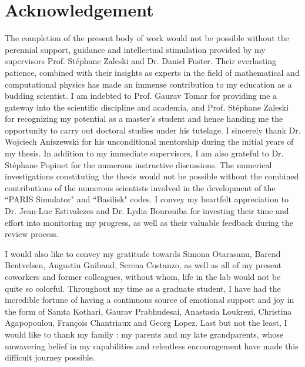 \chapter*{Acknowledgement}

The completion of the present body of work would not be possible without the perennial support, guidance and intellectual stimulation provided by my supervisors Prof. St\'ephane Zaleski and Dr. Daniel Fuster. Their everlasting patience, combined with their insights as experts in the field of mathematical and computational physics has made an immense contribution to my education as a budding scientist. I am indebted to Prof. Gaurav Tomar for providing me a gateway into the scientific discipline and academia, and Prof. St\'ephane Zaleski for recognizing my potential as a master's student and hence handing me the opportunity to carry out doctoral studies under his tutelage. I sincerely thank Dr. Wojciech Aniszewski for his unconditional mentorship during the initial years of my thesis. In addition to my immediate supervisors, I am also grateful to Dr. St\'ephane Popinet for the numerous instructive discussions. The numerical investigations constituting the thesis would not be possible without the combined contributions of the numerous scientists involved in the development of the ``PARIS Simulator" and ``Basilisk" codes. I convey my heartfelt appreciation to Dr. Jean-Luc Estivalezes and Dr. Lydia Bourouiba for investing their time and effort into monitoring my progress, as well as their valuable feedback during the review process.  

I would also like to convey my gratitude towards Simona Otarasanu, Barend Bentvelsen, Augustin Guibaud, Serena Costanzo, as well as all of my present coworkers and former colleagues, without whom, life in the lab would not be quite so colorful. Throughout my time as a graduate student, I have had the incredible fortune of having a continuous source of emotional support and joy in the form of Samta Kothari, Gaurav Prabhudesai, Anastasia Loukrezi, Christina Agapopoulou, François Chantriaux and Georg Lopez.  
Last but not the least, I would like to thank my family : my parents and my late grandparents, whose unwavering belief in my capabilities and relentless encouragement have made this difficult journey possible.    

